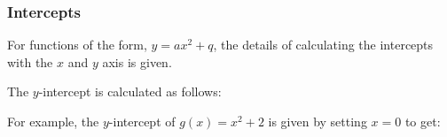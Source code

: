             \subsubsection{ Intercepts}
            \nopagebreak
          \label{m39345*id242875}For functions of the form, $y=a{x}^{2}+q$, the details of calculating the intercepts with the $x$ and $y$ axis is given.\par 
          \label{m39345*id242926}The $y$-intercept is calculated as follows:\par 
          \label{m39345*uid119}\nopagebreak\noindent{}
          \label{m39345*id243039}For example, the $y$-intercept of $g\left(x\right)={x}^{2}+2$ is given by setting $x=0$ to get:\par 
          \label{m39345*id243099}\nopagebreak\noindent{}
